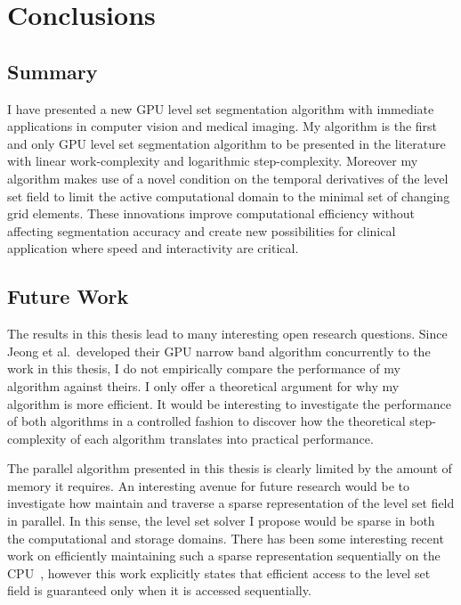 \fancyhead[RO,LE]{\thepage}
\fancyfoot{} 
\chapter{Conclusions}
\label{chapter:conclusions}

\section{Summary}

I have presented a new GPU level set segmentation algorithm with immediate applications in computer vision and medical imaging. My algorithm is the first and only GPU level set segmentation algorithm to be presented in the literature with linear work-complexity and logarithmic step-complexity. Moreover my algorithm makes use of a novel condition on the temporal derivatives of the level set field to limit the active computational domain to the minimal set of changing grid elements. These innovations improve computational efficiency without affecting segmentation accuracy and create new possibilities for clinical application where speed and interactivity are critical.

\section{Future Work}

The results in this thesis lead to many interesting open research questions. Since Jeong et al.\ developed their GPU narrow band algorithm concurrently to the work in this thesis, I do not empirically compare the performance of my algorithm against theirs. I only offer a theoretical argument for why my algorithm is more efficient. It would be interesting to investigate the performance of both algorithms in a controlled fashion to discover how the theoretical step-complexity of each algorithm translates into practical performance.

The parallel algorithm presented in this thesis is clearly limited by the amount of memory it requires. An interesting avenue for future research would be to investigate how maintain and traverse a sparse representation of the level set field in parallel. In this sense, the level set solver I propose would be sparse in both the computational and storage domains. There has been some interesting recent work on efficiently maintaining such a sparse representation sequentially on the CPU~\cite{Houston-2006,Nielsen-2006,Nielsen-2007}, however this work explicitly states that efficient access to the level set field is guaranteed only when it is accessed sequentially.

